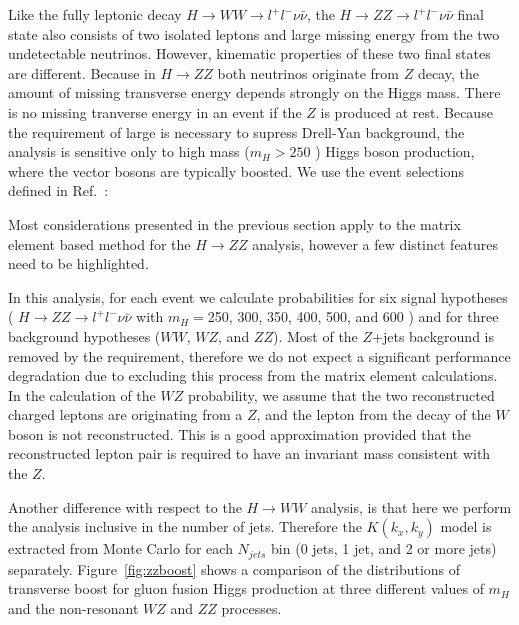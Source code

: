 
Like the fully leptonic decay $H\rightarrow WW \rightarrow l^{+}l^{-}\nu\bar{\nu}$, the $H\rightarrow ZZ\rightarrow l^{+}l^{-}\nu\bar{\nu}$  
final state also consists of two isolated leptons and large missing energy from the two undetectable neutrinos. However, kinematic properties
of these two final states are different. Because in $H\rightarrow ZZ$ both neutrinos originate from $Z$ decay, the amount of missing transverse 
energy depends strongly on the Higgs mass. There is no missing tranverse energy in an event if the $Z$ is produced at rest. Because the
requirement of large \met 
is necessary to supress Drell-Yan background, the analysis is sensitive only to high mass ($m_{H}>250$ \GeVcc) 
Higgs boson production, where the vector bosons are typically boosted. We use the event selections defined in Ref.~\cite{ref:HWW2011smurf}:


Most considerations presented in the previous section apply to the matrix element based method for the $H\rightarrow ZZ$ analysis,
however a few distinct features need to be highlighted. 

In this analysis, for each event  we calculate probabilities for six signal hypotheses (  $H\rightarrow ZZ\rightarrow l^{+}l^{-}\nu\bar{\nu}$
with $m_{H}=$250, 300, 350, 400, 500, and 600 \GeVcc) and for three background hypotheses ($WW$, $WZ$, and $ZZ$). Most of the
$Z$+jets background is removed by the \met requirement, therefore we do not expect a significant performance degradation due to
excluding this process from the matrix element calculations. In the calculation of the $WZ$ probability, we assume that the two reconstructed
charged leptons are originating from a $Z$, and the lepton from the decay of the $W$ boson is not reconstructed. This is a good 
approximation provided that the reconstructed lepton pair is required to have an invariant mass consistent with the $Z$.

Another difference with respect to the $H\rightarrow WW$ analysis, is that here we perform the analysis inclusive in the number of jets. 
Therefore the $K(k_x,k_y)$ model is extracted from Monte Carlo for each $N_{jets}$ bin (0 jets, 1 jet, and 2 or more jets) separately. 
Figure~\ref{fig:zzboost} shows a comparison of the distributions of transverse boost for gluon fusion Higgs production 
at three different values of $m_H$ and the non-resonant $WZ$ and $ZZ$ processes.

